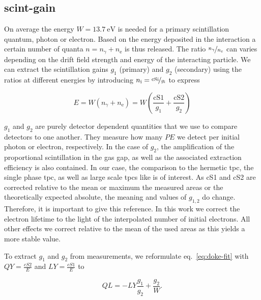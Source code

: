 
\FloatBarrier
\subsection{scint-gain}
\label{ssec:scint-gain}
\FloatBarrier


On average the energy $ W = \SI{13.7}{\electronvolt} $ is needed for a primary scintillation quantum, photon or electron.
Based on the energy deposited in the interaction a certain number of quanta $ n = n_\gamma + n_\mathrm{e} $ is thus released.
The ratio $ \nicefrac{n_\gamma}{n_\mathrm{e}} $ can varies depending on the drift field strength and energy of the interacting particle.
We can extract the scintillation gains $ g_1 $ (primary) and $ g_2 $ (secondary) using the ratios at different energies by introducing $ n_\mathrm{i} = \nicefrac{\mathrm{cSi}}{g_\mathrm{i}} $ to express

\begin{equation}
    E = W \left( n_\gamma + n_\mathrm{e} \right) = W \left( \frac{\mathrm{cS1}}{g_1} + \frac{\mathrm{cS2}}{g_2} \right)
    \label{eq:energy-correction}
\end{equation}

$ g_1 $ and $ g_2 $ are purely detector dependent quantities that we use to compare detectors to one another.
They measure how many $ PE $ we detect per initial photon or electron, respectively.
In the case of $ g_2 $, the amplification of the proportional scintillation in the gas gap, as well as the associated extraction efficiency is also contained.
In our case, the comparison to the hermetic \gls{tpc}, the single phase \gls{tpc}, as well as large scale \gls{tpc}s like \nton is of interest.
As cS1 and cS2 are corrected relative to the mean or maximum the measured areas or the theoretically expected absolute, the meaning and values of $ g_{1,2} $ do change.
Therefore, it is important to give this reference.
In this work we correct the electron lifetime to the light of the interpolated number of initial electrons.
All other effects we correct relative to the mean of the used areas as this yields a more stable value.

To extract $ g_1 $ and $ g_2 $ from measurements, we reformulate eq.~\ref{eq:doke-fit} with $ \mathit{QY} = \frac{cS2}{E} $ and $ \mathit{LY} = \frac{cS1}{E} $ to

\begin{equation}
    \mathit{QL} = - \mathit{LY} \frac{g_1}{g_2} + \frac{g_2}{W}.
    \label{eq:doke-fit}
\end{equation}

